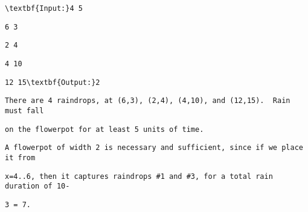 \begin{verbatim}
\textbf{Input:}4 5 \end{verbatim}
\begin{verbatim}
6 3 \end{verbatim}
\begin{verbatim}
2 4 \end{verbatim}
\begin{verbatim}
4 10 \end{verbatim}
\begin{verbatim}
12 15\textbf{Output:}2\end{verbatim}
\begin{verbatim}
There are 4 raindrops, at (6,3), (2,4), (4,10), and (12,15).  Rain must fall \end{verbatim}
\begin{verbatim}
on the flowerpot for at least 5 units of time.\end{verbatim}
\begin{verbatim}
A flowerpot of width 2 is necessary and sufficient, since if we place it from \end{verbatim}
\begin{verbatim}
x=4..6, then it captures raindrops #1 and #3, for a total rain duration of 10-\end{verbatim}
\begin{verbatim}
3 = 7.\end{verbatim}